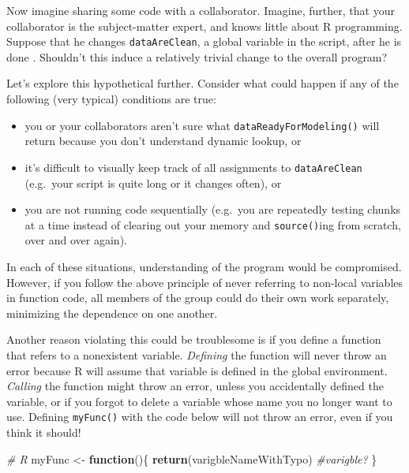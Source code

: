 \documentclass[12pt,krantz2]{krantz}
\makeatletter
\newenvironment{Shaded}{\begin{snugshade}}{\end{snugshade}}
\newcommand{\CommentTok}[1]{\textcolor[rgb]{0.37,0.37,0.37}{\textit{#1}}}
\newcommand{\ControlFlowTok}[1]{\textcolor[rgb]{0.27,0.27,0.27}{\textbf{#1}}}
\newcommand{\KeywordTok}[1]{\textcolor[rgb]{0.27,0.27,0.27}{\textbf{#1}}}
\newcommand{\NormalTok}[1]{#1}
\newcommand{\StringTok}[1]{\textcolor[rgb]{0.5,0.5,0.5}{#1}}
\providecommand{\tightlist}{%
  \setlength{\itemsep}{0pt}\setlength{\parskip}{0pt}}
\newenvironment{kframe}{%
\medskip{}
\setlength{\fboxsep}{.8em}
 \def\at@end@of@kframe{}%
 \ifinner\ifhmode%
  \def\at@end@of@kframe{\end{minipage}}%
  \begin{minipage}{\columnwidth}%
 \fi\fi%
 \def\FrameCommand##1{\hskip\@totalleftmargin \hskip-\fboxsep
 \colorbox{shadecolor}{##1}\hskip-\fboxsep
     \hskip-\linewidth \hskip-\@totalleftmargin \hskip\columnwidth}%
 \MakeFramed {\advance\hsize-\width
   \@totalleftmargin\z@ \linewidth\hsize
   \@setminipage}}%
 {\par\unskip\endMakeFramed%
 \at@end@of@kframe}
\renewenvironment{Shaded}{\begin{kframe}}{\end{kframe}}
\makeatother
\begin{document}
Now imagine sharing some code with a collaborator. Imagine, further, that your collaborator is the subject-matter expert, and knows little about R programming. Suppose that he changes \texttt{dataAreClean}, a global variable in the script, after he is done . Shouldn't this induce a relatively trivial change to the overall program?

Let's explore this hypothetical further. Consider what could happen if any of the following (very typical) conditions are true:

\begin{itemize}
\tightlist
\item
  you or your collaborators aren't sure what \texttt{dataReadyForModeling()} will return because you don't understand dynamic lookup, or
\item
  it's difficult to visually keep track of all assignments to \texttt{dataAreClean} (e.g.~your script is quite long or it changes often), or
\item
  you are not running code sequentially (e.g.~you are repeatedly testing chunks at a time instead of clearing out your memory and \texttt{source()}ing from scratch, over and over again).
\end{itemize}

In each of these situations, understanding of the program would be compromised. However, if you follow the above principle of never referring to non-local variables in function code, all members of the group could do their own work separately, minimizing the dependence on one another.

Another reason violating this could be troublesome is if you define a function that refers to a nonexistent variable. \emph{Defining} the function will never throw an error because R will assume that variable is defined in the global environment. \emph{Calling} the function might throw an error, unless you accidentally defined the variable, or if you forgot to delete a variable whose name you no longer want to use. Defining \texttt{myFunc()} with the code below will not throw an error, even if you think it should!

\begin{Shaded}
\begin{Highlighting}[]
\CommentTok{# R}
\NormalTok{myFunc <-}\StringTok{ }\ControlFlowTok{function}\NormalTok{()\{}
  \KeywordTok{return}\NormalTok{(varigbleNameWithTypo) }\CommentTok{#varigble?}
\NormalTok{\}}
\end{Highlighting}
\end{Shaded}
\end{document}

